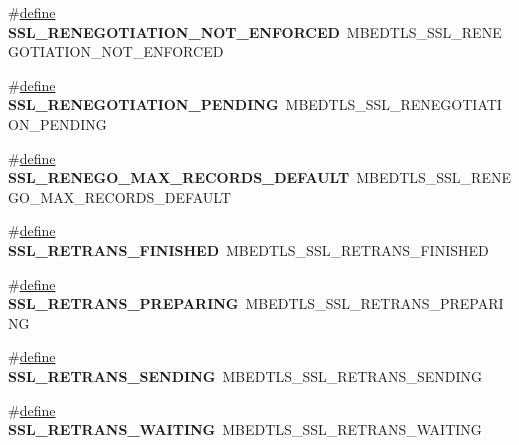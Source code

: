 \begin{DoxyCompactItemize}
\item 
\mbox{\label{compat-1_83_8h_af7a8a713832ae0164b5298c75945ba0e}} 
\#\hyperlink{structdefine}{define} {\bfseries S\+S\+L\+\_\+\+R\+E\+N\+E\+G\+O\+T\+I\+A\+T\+I\+O\+N\+\_\+\+N\+O\+T\+\_\+\+E\+N\+F\+O\+R\+C\+ED}~M\+B\+E\+D\+T\+L\+S\+\_\+\+S\+S\+L\+\_\+\+R\+E\+N\+E\+G\+O\+T\+I\+A\+T\+I\+O\+N\+\_\+\+N\+O\+T\+\_\+\+E\+N\+F\+O\+R\+C\+ED
\item 
\mbox{\label{compat-1_83_8h_a22b6a89d4fcdfdc634d1f14bb7d19e50}} 
\#\hyperlink{structdefine}{define} {\bfseries S\+S\+L\+\_\+\+R\+E\+N\+E\+G\+O\+T\+I\+A\+T\+I\+O\+N\+\_\+\+P\+E\+N\+D\+I\+NG}~M\+B\+E\+D\+T\+L\+S\+\_\+\+S\+S\+L\+\_\+\+R\+E\+N\+E\+G\+O\+T\+I\+A\+T\+I\+O\+N\+\_\+\+P\+E\+N\+D\+I\+NG
\item 
\mbox{\label{compat-1_83_8h_a345b3de11c3837d161cc3fea122a8d4f}} 
\#\hyperlink{structdefine}{define} {\bfseries S\+S\+L\+\_\+\+R\+E\+N\+E\+G\+O\+\_\+\+M\+A\+X\+\_\+\+R\+E\+C\+O\+R\+D\+S\+\_\+\+D\+E\+F\+A\+U\+LT}~M\+B\+E\+D\+T\+L\+S\+\_\+\+S\+S\+L\+\_\+\+R\+E\+N\+E\+G\+O\+\_\+\+M\+A\+X\+\_\+\+R\+E\+C\+O\+R\+D\+S\+\_\+\+D\+E\+F\+A\+U\+LT
\item 
\mbox{\label{compat-1_83_8h_ad3513ce3b7cbc987d6efe517f275f6d1}} 
\#\hyperlink{structdefine}{define} {\bfseries S\+S\+L\+\_\+\+R\+E\+T\+R\+A\+N\+S\+\_\+\+F\+I\+N\+I\+S\+H\+ED}~M\+B\+E\+D\+T\+L\+S\+\_\+\+S\+S\+L\+\_\+\+R\+E\+T\+R\+A\+N\+S\+\_\+\+F\+I\+N\+I\+S\+H\+ED
\item 
\mbox{\label{compat-1_83_8h_a9882ebd42973aea2a20eb336d9305184}} 
\#\hyperlink{structdefine}{define} {\bfseries S\+S\+L\+\_\+\+R\+E\+T\+R\+A\+N\+S\+\_\+\+P\+R\+E\+P\+A\+R\+I\+NG}~M\+B\+E\+D\+T\+L\+S\+\_\+\+S\+S\+L\+\_\+\+R\+E\+T\+R\+A\+N\+S\+\_\+\+P\+R\+E\+P\+A\+R\+I\+NG
\item 
\mbox{\label{compat-1_83_8h_a1b9be0ebe8dfbd3bbf3a1728e7e3b67e}} 
\#\hyperlink{structdefine}{define} {\bfseries S\+S\+L\+\_\+\+R\+E\+T\+R\+A\+N\+S\+\_\+\+S\+E\+N\+D\+I\+NG}~M\+B\+E\+D\+T\+L\+S\+\_\+\+S\+S\+L\+\_\+\+R\+E\+T\+R\+A\+N\+S\+\_\+\+S\+E\+N\+D\+I\+NG
\item 
\mbox{\label{compat-1_83_8h_a8789483803f2041da0b0ee305b29103f}} 
\#\hyperlink{structdefine}{define} {\bfseries S\+S\+L\+\_\+\+R\+E\+T\+R\+A\+N\+S\+\_\+\+W\+A\+I\+T\+I\+NG}~M\+B\+E\+D\+T\+L\+S\+\_\+\+S\+S\+L\+\_\+\+R\+E\+T\+R\+A\+N\+S\+\_\+\+W\+A\+I\+T\+I\+NG

\end{DoxyCompactItemize}
